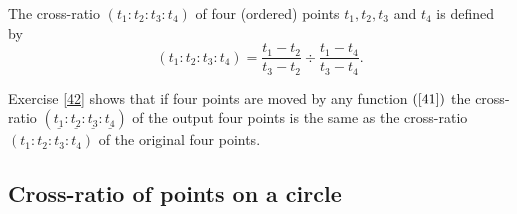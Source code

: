 \documentclass{ximera}
\begin{document}
\begin{definition}
\label{44}The cross-ratio $\left(  t_{1}:t_{2}:t_{3}:t_{4}\right)  $ of four
(ordered) points $t_{1},t_{2},t_{3}$ and $t_{4}$ is defined by%
\[
\left(  t_{1}:t_{2}:t_{3}:t_{4}\right)  =\frac{t_{1}-t_{2}}{t_{3}-t_{2}}%
\div\frac{t_{1}-t_{4}}{t_{3}-t_{4}}.
\]

\end{definition}

Exercise \ref{42} shows that if four points are moved by any function $\left(
\ref{41}\right)  $ the cross-ratio $\left(  \underline{t_{1}}:\underline
{t_{2}}:\underline{t_{3}}:\underline{t_{4}}\right)  $ of the output four
points is the same as the cross-ratio $\left(  t_{1}:t_{2}:t_{3}:t_{4}\right)
$ of the original four points.












\subsection*{Cross-ratio of points on a circle}
\end{document}
